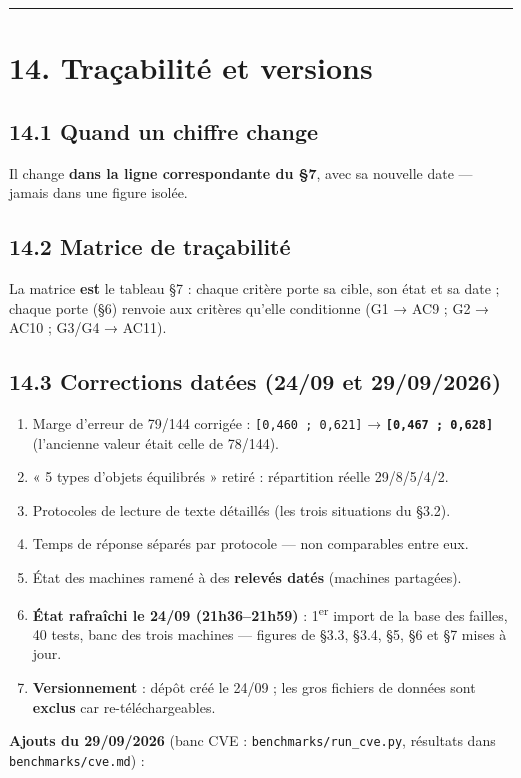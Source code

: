\documentclass[11pt,a4paper]{article}
\begin{document}
\medskip\hrule\medskip
\section*{14. Traçabilité et versions}
\subsection*{14.1 Quand un chiffre change}
Il change \textbf{dans la ligne correspondante du §7}, avec sa nouvelle date — jamais dans une figure isolée.

\subsection*{14.2 Matrice de traçabilité}
La matrice \textbf{est} le tableau §7 : chaque critère porte sa cible, son état et sa date ; chaque porte (§6) renvoie aux critères qu'elle conditionne (G1 → AC9 ; G2 → AC10 ; G3/G4 → AC11).

\subsection*{14.3 Corrections datées (24/09 et 29/09/2026)}
\begin{enumerate}  \item Marge d'erreur de 79/144 corrigée : \texttt{[0,460 ; 0,621]} → \textbf{\texttt{[0,467 ; 0,628]}} (l'ancienne valeur était celle de 78/144).
  \item « 5 types d'objets équilibrés » retiré : répartition réelle 29/8/5/4/2.
  \item Protocoles de lecture de texte détaillés (les trois situations du §3.2).
  \item Temps de réponse séparés par protocole — non comparables entre eux.
  \item État des machines ramené à des \textbf{relevés datés} (machines partagées).
  \item \textbf{État rafraîchi le 24/09 (21h36–21h59)} : 1\textsuperscript{er} import de la base des failles, 40 tests, banc des trois machines — figures de §3.3, §3.4, §5, §6 et §7 mises à jour.
  \item \textbf{Versionnement} : dépôt créé le 24/09 ; les gros fichiers de données sont \textbf{exclus} car re-téléchargeables.
\end{enumerate}

\textbf{Ajouts du 29/09/2026} (banc CVE : \texttt{benchmarks/run\_\allowbreak{}cve.py}, résultats dans \texttt{benchmarks/cve.md}) :
\end{document}
